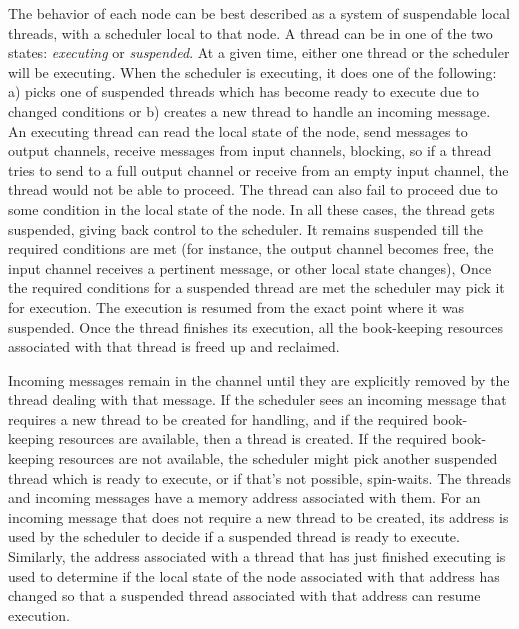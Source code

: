 The behavior of each node can be best described as a system of suspendable local
threads, with a scheduler local to that node. A thread can be in one of the two
states: \emph{executing} or \emph{suspended}. At a given time, either one
thread or the scheduler will be executing. When the scheduler is executing,
it does one of the following: a) picks one of suspended threads
which has become ready to execute due to changed conditions or b) creates a new
thread to handle an incoming message. An executing thread can read the local
state of the node, send messages to output channels, receive messages from
input channels, \etc{}%
blocking, so if a thread tries to send to a full output channel or receive from
an empty input channel, the thread would not be able to proceed. The thread can
also fail to proceed due to some condition in the local state of the node. In
all these cases, the thread gets suspended, giving back control to the
scheduler. It remains suspended till the required conditions are met (for
instance, the output channel becomes free, the input channel receives a
pertinent message, or other local state changes), Once the required conditions
for a suspended thread are met the scheduler may pick it for execution. The
execution is resumed from the exact point where it was suspended. Once the
thread finishes its execution, all the book-keeping resources associated with
that thread is freed up and reclaimed.

Incoming messages remain in the channel until they are explicitly removed by
the thread dealing with that message. If the scheduler sees an incoming message
that requires a new thread to be created for handling, and if the required
book-keeping resources are available, then a thread is created.
If the
required book-keeping resources are not available, the scheduler might pick
another suspended thread which is ready to execute, or if that's not possible,
spin-waits.  The threads and incoming messages have a memory address associated
with them. For an incoming message that does not require a new thread to be
created, its address is used by the scheduler to decide if a suspended thread
is ready to execute. Similarly, the address associated with a thread that has
just finished executing is used to determine if the local state of the node
associated with that address has changed so that a suspended thread associated
with that address can resume execution.  

